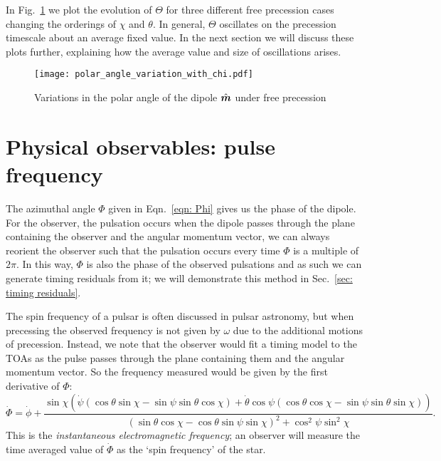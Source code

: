 \documentclass[../full_thesis/full_thesis.tex]{subfiles}
\begin{document}
In Fig.~\ref{fig: polar angle variations} we plot the evolution of $\Theta$ for
three different free precession cases changing the orderings of $\chi$ and
$\theta$. In general, $\Theta$ oscillates on the precession timescale about an
average fixed value. In the next section we will discuss these plots further,
explaining how the average value and size of oscillations arises.
\begin{figure}[ht]
\centering
  \texttt{[image: polar\_angle\_variation\_with\_chi.pdf]}
\caption{Variations in the polar angle of the dipole $\hat{\boldsymbol{m}}$ under free precession}
\label{fig: polar angle variations}
\end{figure}

\section{Physical observables: pulse frequency}
The azimuthal angle $\Phi$ given in Eqn.~\eqref{eqn: Phi} gives us the phase of
the dipole. For the observer, the pulsation occurs when the dipole passes through
the plane containing the observer and the angular momentum vector,  we can always reorient
the observer such that the pulsation occurs every time $\Phi$ is a multiple of $2\pi$.
In this way, $\Phi$ is also the phase of the observed pulsations and as such
we can generate timing residuals from it; we will demonstrate this method in
Sec.~\ref{sec: timing residuals}.

The spin frequency of a pulsar is often discussed in pulsar astronomy, but when
precessing the observed frequency is not given by $\omega$ due to the
additional motions of precession. Instead, we note that the observer would
fit a timing model to the TOAs as the pulse passes through the plane containing
them and the angular momentum vector. So the frequency measured would be given
by the first derivative of $\Phi$:
\begin{equation}
\dot{\Phi} = \dot{\phi}
+ \frac{\sin\chi \left(
\dot{\psi} (\cos\theta\sin\chi - \sin \psi \sin \theta \cos\chi) +
\dot{\theta} \cos\psi (\cos\theta\cos\chi - \sin \psi \sin \theta \sin\chi)\right)
}{(\sin\theta \cos \chi - \cos \theta \sin \psi \sin \chi)^{2} + \cos^{2}\psi \sin^{2} \chi}.
\label{eqn: Phi_dot}
\end{equation}
This is the \emph{instantaneous electromagnetic frequency}; an observer
will measure the time averaged value of $\dot{\Phi}$ as the `spin frequency' of
the star.
\end{document}

